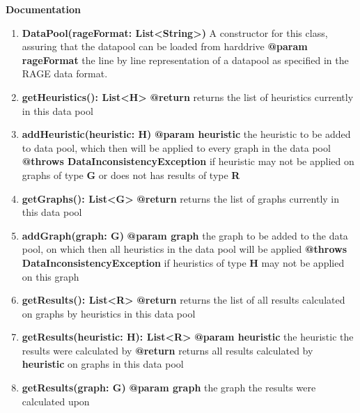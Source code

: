 	\textbf{Documentation}
	\begin{enumerate}[+]
		\item{
			\textbf{DataPool(rageFormat: List<String>)} \newline
			A constructor for this class, assuring that the datapool can be loaded from harddrive \newline
			\textbf{@param rageFormat} the line by line representation of a datapool as specified in the RAGE data format.
		}
		\item{
			\textbf{getHeuristics(): List<H>} \newline
			\textbf{@return} returns the list of heuristics currently in this data pool
		}
		\item{
			\textbf{addHeuristic(heuristic: H)} \newline
			\textbf{@param heuristic} the heuristic to be added to data pool, which then will be applied to every graph in the data pool \newline
			\textbf{@throws DataInconsistencyException} if heuristic may not be applied on graphs of type \textbf{G} or does not has results of type \textbf{R}
		}
		\item{
			\textbf{getGraphs(): List<G>} \newline
			\textbf{@return} returns the list of graphs currently in this data pool
		}
		\item{
			\textbf{addGraph(graph: G)} \newline
			\textbf{@param graph} the graph to be added to the data pool, on which then all heuristics in the data pool will be applied \newline
			\textbf{@throws DataInconsistencyException} if heuristics of type \textbf{H} may not be applied on this graph
		}
		\item{
			\textbf{getResults(): List<R>} \newline
			\textbf{@return} returns the list of all results calculated on graphs by heuristics in this data pool
		}
		\item{
			\textbf{getResults(heuristic: H): List<R>} \newline
			\textbf{@param heuristic} the heuristic the results were calculated by \newline
			\textbf{@return} returns all results calculated by \textbf{heuristic} on graphs in this data pool 
		}
		\item{
			\textbf{getResults(graph: G)} \newline
			\textbf{@param graph} the graph the results were calculated upon \newline
}
\end{enumerate}
